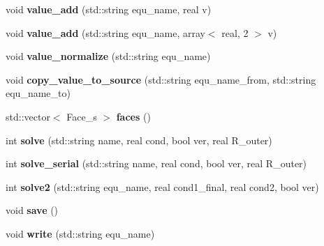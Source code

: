 \begin{DoxyCompactItemize}
\item 
\hypertarget{classProb_aa5c8f3a5c0e9a15e054ca37d150a8921}{
void {\bfseries value\_\-add} (std::string equ\_\-name, real v)}
\label{classProb_aa5c8f3a5c0e9a15e054ca37d150a8921}

\item 
\hypertarget{classProb_a8dd6bf7649956711e74ccc58957186d8}{
void {\bfseries value\_\-add} (std::string equ\_\-name, array$<$ real, 2 $>$ v)}
\label{classProb_a8dd6bf7649956711e74ccc58957186d8}

\item 
\hypertarget{classProb_ad0c1ce9a1ffc181bf289aed404a2bb45}{
void {\bfseries value\_\-normalize} (std::string equ\_\-name)}
\label{classProb_ad0c1ce9a1ffc181bf289aed404a2bb45}

\item 
\hypertarget{classProb_a7bb25a9a766484c678d7e23e4b5ea4a7}{
void {\bfseries copy\_\-value\_\-to\_\-source} (std::string equ\_\-name\_\-from, std::string equ\_\-name\_\-to)}
\label{classProb_a7bb25a9a766484c678d7e23e4b5ea4a7}

\item 
\hypertarget{classProb_ac298114d98ebe5296ede77dafc3f4df3}{
std::vector$<$ Face\_\-s $>$ {\bfseries faces} ()}
\label{classProb_ac298114d98ebe5296ede77dafc3f4df3}

\item 
\hypertarget{classProb_a7224056a4b6649080d3e2deeab2faaad}{
int {\bfseries solve} (std::string name, real cond, bool ver, real R\_\-outer)}
\label{classProb_a7224056a4b6649080d3e2deeab2faaad}

\item 
\hypertarget{classProb_a2485482a64a7f4f3d7ef75ba3a4687b0}{
int {\bfseries solve\_\-serial} (std::string name, real cond, bool ver, real R\_\-outer)}
\label{classProb_a2485482a64a7f4f3d7ef75ba3a4687b0}

\item 
\hypertarget{classProb_ae50c9b74ff1590305dac1e64988a6d8b}{
int {\bfseries solve2} (std::string equ\_\-name, real cond1\_\-final, real cond2, bool ver)}
\label{classProb_ae50c9b74ff1590305dac1e64988a6d8b}

\item 
\hypertarget{classProb_a187e846a4f4eed21758efaa63ede9ec1}{
void {\bfseries save} ()}
\label{classProb_a187e846a4f4eed21758efaa63ede9ec1}

\item 
\hypertarget{classProb_ad790058d97221b21c665d550650c15ad}{
void {\bfseries write} (std::string equ\_\-name)}
\label{classProb_ad790058d97221b21c665d550650c15ad}

\end{DoxyCompactItemize}
